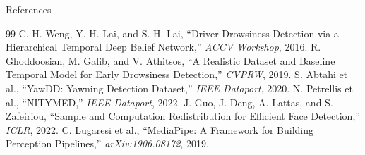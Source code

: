 \documentclass{beamer}
\begin{document}
\begin{frame}{References}
    \begin{thebibliography}{99}
         C.-H. Weng, Y.-H. Lai, and S.-H. Lai, ``Driver Drowsiness Detection via a Hierarchical Temporal Deep Belief Network,'' \emph{ACCV Workshop}, 2016.
         R. Ghoddoosian, M. Galib, and V. Athitsos, ``A Realistic Dataset and Baseline Temporal Model for Early Drowsiness Detection,'' \emph{CVPRW}, 2019.
         S. Abtahi et al., ``YawDD: Yawning Detection Dataset,'' \emph{IEEE Dataport}, 2020.
         N. Petrellis et al., ``NITYMED,'' \emph{IEEE Dataport}, 2022.
         J. Guo, J. Deng, A. Lattas, and S. Zafeiriou, ``Sample and Computation Redistribution for Efficient Face Detection,'' \emph{ICLR}, 2022.
         C. Lugaresi et al., ``MediaPipe: A Framework for Building Perception Pipelines,'' \emph{arXiv:1906.08172}, 2019.
    \end{thebibliography}
\end{frame}
\end{document}
